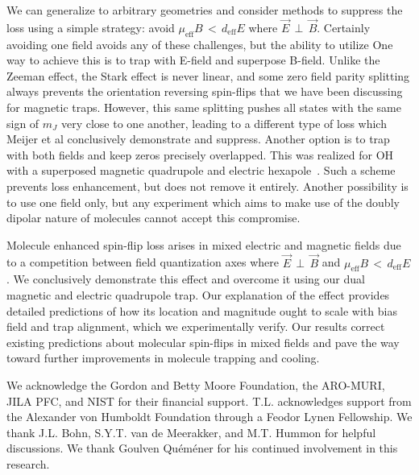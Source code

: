 \documentclass[%
 reprint,
 amsmath,amssymb,
 aps,
prl,
]{revtex4-1}
\newcommand{\epb}{{$\vec{E}\,{\perp}\,\vec{B}$}}
\begin{document}
We can generalize to arbitrary geometries and consider methods to suppress the loss using a simple strategy: avoid $\mu_\text{eff}B \,{<}\, d_\text{eff}E$ where \epb.
Certainly avoiding  one field avoids any of these challenges, but the ability to utilize 
One way to achieve this is to trap with E-field and superpose B-field.
Unlike the Zeeman effect, the Stark effect is never linear, and some zero field parity splitting always prevents the orientation reversing spin-flips that we have been discussing for magnetic traps. 
However, this same splitting pushes all states with the same sign of $m_J$ very close to one another, leading to a different type of loss which Meijer et al conclusively demonstrate and suppress.
Another option is to trap with both fields and keep zeros precisely overlapped. 
This was realized for OH with a superposed magnetic quadrupole and electric hexapole~\cite{Sawyer2007}. 
Such a scheme prevents loss enhancement, but does not remove it entirely. 
Another possibility is to use one field only, but any experiment which aims to make use of the doubly dipolar nature of molecules cannot accept this compromise. 

Molecule enhanced spin-flip loss arises in mixed electric and magnetic fields due to a competition between field quantization axes where \epb{} and $\mu_\text{eff}B\,{<}\,d_\text{eff}E$. 
We conclusively demonstrate this effect and overcome it using our dual magnetic and electric quadrupole trap. 
Our explanation of the effect provides detailed predictions of how its location and magnitude ought to scale with bias field and trap alignment, which we experimentally verify. 
Our results correct existing predictions about molecular spin-flips in mixed fields and pave the way toward further improvements in molecule trapping and cooling.

\begin{acknowledgments}
We acknowledge the Gordon and Betty Moore Foundation, the ARO-MURI, JILA PFC, and NIST for their financial support. 
T.L. acknowledges support from the Alexander von Humboldt Foundation through a Feodor Lynen Fellowship. 
We thank J.L. Bohn, S.Y.T. van de Meerakker, and M.T. Hummon for helpful discussions. 
We thank Goulven Qu\'em\'ener for his continued involvement in this research.
\end{acknowledgments}



\end{document}
